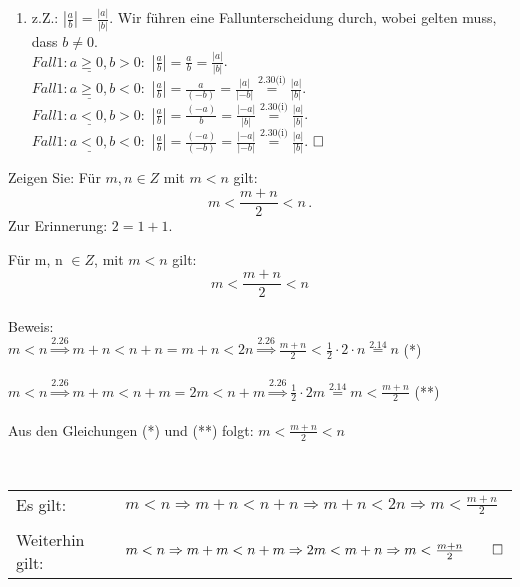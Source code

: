 \begin{lsg}
\begin{enumerate}[label=$\mathrm{(\roman*)}$, ref=$\mathrm{\roman*}$]
	\item z.Z.: \(|\frac{a}{b}|=\frac{|a|}{|b|}\). Wir führen eine Fallunterscheidung durch, wobei gelten muss, dass \(b\neq0\). \\
		\(\underline{Fall 1: a\geq 0, b> 0:}\) \quad \(|\frac{a}{b}|=\frac{a}{b}=\frac{|a|}{|b|}\). \\
		\(\underline{Fall 1: a\geq 0, b< 0:}\) \quad \(|\frac{a}{b}|=\frac{a}{(-b)}=\frac{|a|}{|-b|}\overset{\text{2.30(i)}}{=} \frac{|a|}{|b|}\). \\
		\(\underline{Fall 1: a< 0, b> 0:}\) \quad \(|\frac{a}{b}|=\frac{(-a)}{b}=\frac{|-a|}{|b|}\overset{\text{2.30(i)}}{=} \frac{|a|}{|b|}\). \\
		\(\underline{Fall 1: a< 0, b< 0:}\) \quad \(|\frac{a}{b}|=\frac{(-a)}{(-b)}=\frac{|-a|}{|-b|}\overset{\text{2.30(i)}}{=} \frac{|a|}{|b|}\). \(\hfill \square\) \\
\end{enumerate}
\end{lsg}

\bigskip



\begin{aufg}[4 Punkte]\label{mittel}
Zeigen Sie: Für $m,n\in Z$ mit $m<n$ gilt:
\[ m<\frac{m+n}{2} < n\,.\]
Zur Erinnerung: $2 = 1+1$.
\end{aufg}
 
\bigskip 
 
\begin{lsg}
Für m, n $ \in Z$, 
mit $m < n$ gilt:
\[m<\frac{m+n}{2}<n\] 
\\ Beweis:
\\ $m<n \overset{2.26}{\Rightarrow} m+n < n+n = m+n < 2n \overset{2.26}{\Rightarrow} \frac{m+n}{2}< \frac{1}{2}\cdot 2 \cdot n \overset{2.14}{=} n $ (*)
\\
\\$ m<n\overset{2.26}{\Rightarrow} m+m < n+m = 2m < n+m \overset{2.26}{\Rightarrow} \frac{1}{2}\cdot2m \overset{2.14}{=} m < \frac{m+n}{2} $ (**)
\\
\\ Aus den Gleichungen (*) und (**) folgt: $m<\frac{m+n}{2}<n$
\end{lsg}

\bigskip

\begin{lsg}[L\"osung~2]
	~\\[2ex]
	\begin{tabular}{ll}
		Es gilt: & $m<n \Rightarrow m+n<n+n \Rightarrow m+n<2n \Rightarrow m< \frac{m+n}{2}$ \\
		&\\
	Weiterhin gilt: & $m<n \Rightarrow m+m < n+m \Rightarrow 2m < m+n \Rightarrow m<\frac{m+n}{2} \qed$\\
	\end{tabular}



\end{lsg}


